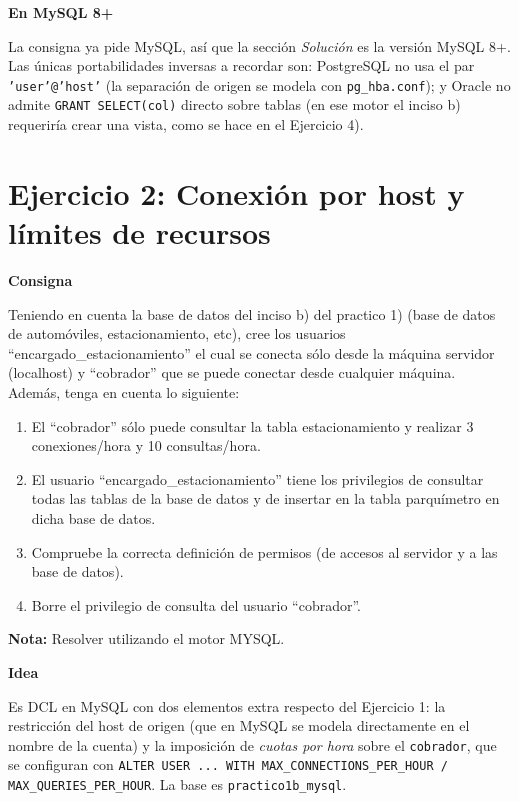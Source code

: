 \documentclass[11pt,a4paper]{article}
\newcommand{\itemcabecera}[1]{\noindent\textbf{#1}\par\medskip}
\newcommand{\bloqueConsigna}{\itemcabecera{Consigna}}
\newcommand{\bloqueIdea}{\itemcabecera{Idea}}
\newcommand{\bloqueMySQL}{\itemcabecera{En MySQL 8+}}
\begin{document}
\bloqueMySQL

La consigna ya pide MySQL, así que la sección \textit{Solución} es la versión MySQL 8+. Las únicas portabilidades inversas a recordar son: PostgreSQL no usa el par \texttt{'user'@'host'} (la separación de origen se modela con \texttt{pg\_hba.conf}); y Oracle no admite \texttt{GRANT SELECT(col)} directo sobre tablas (en ese motor el inciso b) requeriría crear una vista, como se hace en el Ejercicio 4).

\section{Ejercicio 2: Conexión por host y límites de recursos}

\bloqueConsigna

Teniendo en cuenta la base de datos del inciso b) del practico 1) (base de datos de automóviles, estacionamiento, etc), cree los usuarios ``encargado\_estacionamiento'' el cual se conecta sólo desde la máquina servidor (localhost) y ``cobrador'' que se puede conectar desde cualquier máquina. Además, tenga en cuenta lo siguiente:

\begin{enumerate}[label=\alph*),leftmargin=*]
    \item El ``cobrador'' sólo puede consultar la tabla estacionamiento y realizar 3 conexiones/hora y 10 consultas/hora.
    \item El usuario ``encargado\_estacionamiento'' tiene los privilegios de consultar todas las tablas de la base de datos y de insertar en la tabla parquímetro en dicha base de datos.
    \item Compruebe la correcta definición de permisos (de accesos al servidor y a las base de datos).
    \item Borre el privilegio de consulta del usuario ``cobrador''.
\end{enumerate}

\textbf{Nota:} Resolver utilizando el motor MYSQL.

\bloqueIdea

Es DCL en MySQL con dos elementos extra respecto del Ejercicio 1: la restricción del host de origen (que en MySQL se modela directamente en el nombre de la cuenta) y la imposición de \emph{cuotas por hora} sobre el \texttt{cobrador}, que se configuran con \texttt{ALTER USER ... WITH MAX\_CONNECTIONS\_PER\_HOUR / MAX\_QUERIES\_PER\_HOUR}. La base es \texttt{practico1b\_mysql}.
\end{document}
